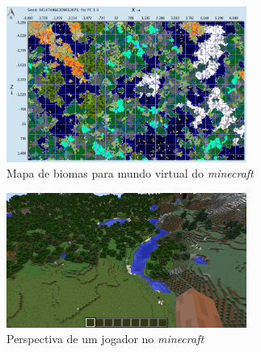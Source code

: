 \begin{figure}[H]
    \centering
    \includegraphics[width=0.7\textwidth]{figuras/chunkbasebiomes.png}
    \caption{Mapa de biomas para mundo virtual do \textit{minecraft}}
    \label{fig:chunkbasebiomes}
\end{figure}

\begin{figure}[H]
    \centering
    \includegraphics[width=0.7\textwidth]{figuras/biomesminecraftgameplay.png}
    \caption{Perspectiva de um jogador no \textit{minecraft}}
    \label{fig:biomesminecraftgameplay}
\end{figure}




%
